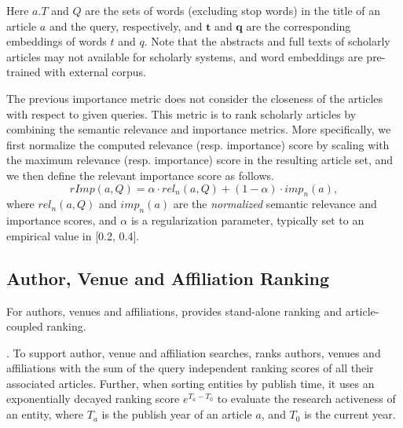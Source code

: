 Here $a.T$ and $Q$ are the sets of words (excluding stop words) in the title of an article $a$ and the query, respectively, %
and $\textbf{t}$ and $\textbf{q}$ are the corresponding embeddings of words $t$ and $q$.
Note that the abstracts and full texts of scholarly articles may not available for scholarly systems, and word embeddings are pre-trained with external corpus. 




 The previous importance metric does not consider the closeness of the articles with respect to given queries. This metric is to rank scholarly articles by combining the semantic relevance and importance metrics. More specifically, we first normalize the computed relevance (resp. importance) score by scaling with the maximum relevance (resp. importance) score in the resulting article set, and we then define the relevant importance score as follows.
\begin{equation}
\label{eq:relimp}
rImp(a, Q) = \alpha \cdot rel_n(a, Q) + (1-\alpha)\cdot imp_n(a),
\end{equation}
where $rel_n(a, Q)$ and $imp_n(a)$ are the {\em normalized} semantic relevance and importance scores, and $\alpha$ is a regularization parameter,
typically set to an empirical value in [0.2, 0.4].



\subsection{Author, Venue and Affiliation Ranking}
\label{subsec:heteroRanking}

For authors, venues and affiliations,  \oursystem provides stand-alone ranking and article-coupled ranking.

. To support author, venue and affiliation searches, \oursystem ranks authors, venues and affiliations with the sum of the query independent ranking scores of all their associated articles. Further, when sorting entities by publish time, it uses an exponentially decayed ranking score $e^{T_a-T_0}$ to evaluate the research activeness of an entity, where $T_a$ is the publish year of an article $a$, and $T_0$ is the current year.

